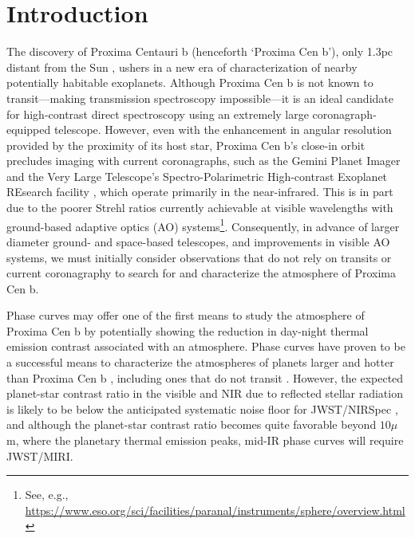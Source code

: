\documentclass{emulateapj}
\begin{document}

\section{Introduction\label{sec:intro}}

The discovery of Proxima Centauri b (henceforth `Proxima Cen b'), only 1.3pc distant from the Sun \citep{Anglada-Escude2016}, ushers in a new era of characterization of nearby potentially habitable exoplanets. Although Proxima Cen b is not known to transit---making transmission spectroscopy impossible---it is an ideal candidate for high-contrast direct spectroscopy using an extremely large coronagraph-equipped telescope. However, even with the enhancement in angular resolution provided by the proximity of its host star, Proxima Cen b's close-in orbit \citep[$a = 0.0485$ AU;][]{Anglada-Escude2016} precludes imaging with current coronagraphs, such as the Gemini Planet Imager \citep[GPI;][]{Macintosh2014} and the Very Large Telescope's Spectro-Polarimetric High-contrast Exoplanet REsearch facility \citep[VLT-SPHERE;][]{Beuzit2008}, which operate primarily in the near-infrared. This is in part due to the poorer Strehl ratios currently achievable at visible wavelengths with ground-based adaptive optics (AO) systems\footnote{See, e.g., \url{https://www.eso.org/sci/facilities/paranal/instruments/sphere/overview.html}}. Consequently, in advance of larger diameter ground- and space-based telescopes, and improvements in visible AO systems, we must initially consider observations that do not rely on transits or current coronagraphy to search for and characterize the atmosphere of Proxima Cen b.

Phase curves may offer one of the first means to study the atmosphere of Proxima Cen b \citep{Turbet2016,Kreidberg2016,Meadows2016} by potentially showing the reduction in day-night thermal emission contrast associated with an atmosphere. Phase curves have proven to be a successful means to characterize the atmospheres of planets larger and hotter than Proxima Cen b \citep{Cowan2007, Knutson2007, Knutson2008, Crossfield2010, Brogi2012, Zellem2014, Stevenson2014}, including ones that do not transit \citep{Selsis2011, Faigler2011, Maurin2012, Brogi2014}. However, the expected planet-star contrast ratio in the visible and NIR due to reflected stellar radiation is likely to be below the anticipated systematic noise floor for JWST/NIRSpec \citep{Meadows2016}, and although the planet-star contrast ratio becomes quite favorable beyond $10\mu$m, where the planetary thermal emission peaks, mid-IR phase curves will require JWST/MIRI.  
\end{document}

